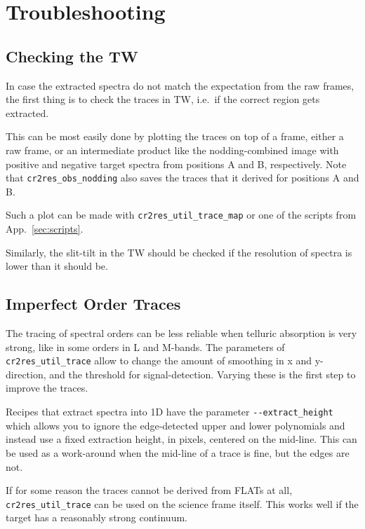 \section{Troubleshooting}
\label{sec:troubleshooting}



\subsection{Checking the TW}

In case the extracted spectra do not match the expectation from the raw frames,
the first thing is to check the traces in TW, i.e.~if the correct region gets
extracted.

This can be most easily done by plotting the traces on top of a
frame, either a raw frame, or an intermediate product like the nodding-combined
image with positive and negative target spectra from positions A and B,
respectively. Note that \texttt{cr2res\_obs\_nodding} also saves the traces that it derived for positions A and B.

Such a plot can be made with \texttt{cr2res\_util\_trace\_map} or one of the
scripts from App.~\ref{sec:scripts}.

Similarly, the slit-tilt in the TW should be checked if the resolution of
spectra is lower than it should be.


\subsection{Imperfect Order Traces}

The tracing of spectral orders can be less reliable when telluric absorption
is very strong, like in some orders in L and M-bands. The parameters of
\texttt{cr2res\_util\_trace} allow to change the amount of smoothing in x and
y-direction, and the threshold for signal-detection. Varying these is the first
step to improve the traces.

Recipes that extract spectra into 1D have the parameter
\verb!--extract_height! which allows you to ignore the edge-detected upper
and lower polynomials and instead use a fixed extraction height, in pixels,
centered on the mid-line. This can be used as a work-around when the mid-line of
a trace is fine, but the edges are not.

If for some reason the traces cannot be derived from FLATs at all,
\texttt{cr2res\_util\_trace} can be used on the science frame itself. This works
well if the target has a reasonably strong continuum.



